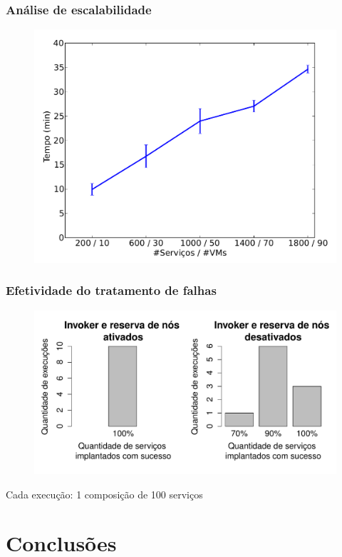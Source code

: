 \documentclass{beamer}
\begin{document}
\begin{frame}
\frametitle{Análise de escalabilidade}

\begin{figure}
\includegraphics[width=0.8\linewidth]{img/scalability}
\end{figure}

\end{frame}


\begin{frame}
\frametitle{Efetividade do tratamento de falhas}

\begin{figure}
\includegraphics[width=0.9\linewidth]{img/error_handling}
\end{figure}

Cada execução: 1 composição de 100 serviços

\end{frame}



\section{Conclusões}
\end{document}
